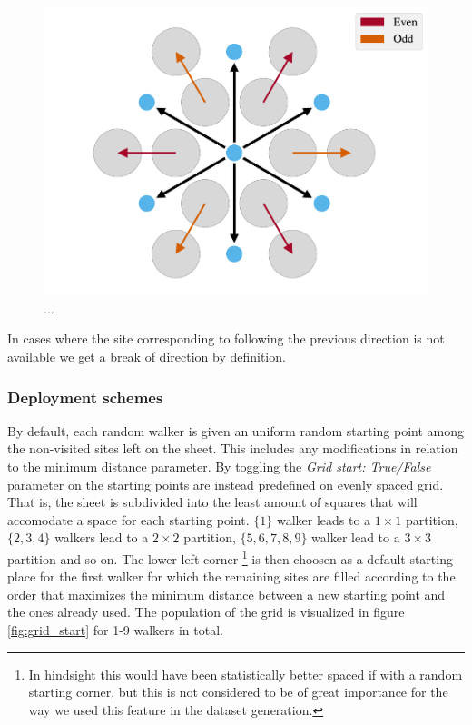 \begin{figure}[H]
  \centering
  \includegraphics[width=0.5\linewidth]{figures/system/stay_or_break.pdf}
  \caption{...}
  \label{fig:stay_or_break}
\end{figure}


In cases where the site corresponding to following the previous direction is not available we get a break of direction by definition. 

\subsubsection{Deployment schemes} %
By default, each random walker is given an uniform random starting point among
the non-visited sites left on the sheet. This includes any modifications in
relation to the minimum distance parameter. By toggling the \textit{Grid start:
True/False} parameter on the starting points are instead predefined on evenly
spaced grid. That is, the sheet is subdivided into the least amount of squares
that will accomodate a space for each starting point. $\{1\}$ walker leads to a
$1\times 1$ partition, $\{2,3,4\}$ walkers lead to a $2\times 2$ partition,
$\{5,6,7,8,9\}$ walker lead to a $3\times 3$ partition and so on. The lower left
corner \footnote{In hindsight this would have been statistically better spaced
if with a random starting corner, but this is not considered to be of great
importance for the way we used this feature in the dataset generation.} is then choosen as a default starting place for the first
walker for which the remaining sites are filled according to the order that
maximizes the minimum distance between a new starting point and the ones already
used. The population of the grid is visualized in figure \ref{fig:grid_start} for 1-9 walkers in total. 


